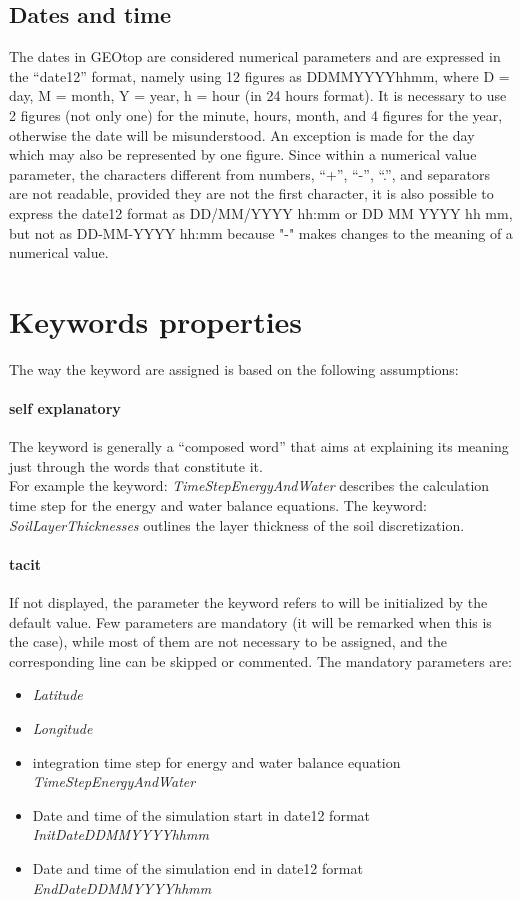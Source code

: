 \subsection{Dates and time}
The dates in GEOtop are considered numerical parameters and are expressed in the ``date12'' format, namely using 12 figures as DDMMYYYYhhmm, where D = day, M = month, Y = year, h = hour (in 24 hours format).
 It is necessary to use 2 figures (not only one) for the minute, hours, month, and 4 figures for the year, otherwise the date will be misunderstood. An exception is made for the day which may also be represented by one figure.
 Since within a numerical value parameter, the characters different from numbers, ``+'', ``-'', ``.'', and separators are not readable, provided they are not the first character, it is also possible to express the date12 format as DD/MM/YYYY hh:mm or DD MM YYYY hh mm, but not as DD-MM-YYYY hh:mm because "-" makes changes to the meaning of a numerical value.


\section{Keywords properties}\label{Par_keyprop}

The way the keyword are assigned is based on the following assumptions:

\paragraph{self explanatory} The keyword is generally a ``composed word'' that aims at explaining its meaning just through the words that constitute it. \\
For example the keyword: {\it TimeStepEnergyAndWater} describes the calculation time step for the energy and water balance equations. The keyword: {\it SoilLayerThicknesses} outlines the layer thickness of the soil discretization.

\paragraph{tacit}If not displayed, the parameter the keyword refers to will be initialized by the default value.
Few parameters are mandatory (it will be remarked when this is the case), while most of them are not necessary to be assigned, and the corresponding line can be skipped or commented.
The mandatory parameters are:
\begin{itemize}
\item {\it Latitude}
\item {\it Longitude}
\item integration time step for energy and water balance equation {\it TimeStepEnergyAndWater}
\item Date and time of the simulation start in date12 format {\it InitDateDDMMYYYYhhmm}
\item Date and time of the simulation end in date12 format {\it EndDateDDMMYYYYhhmm}                        
\end{itemize}

